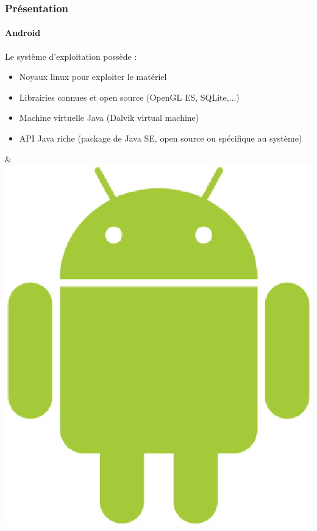 \begin{frame}
\frametitle{Présentation}
\framesubtitle{Android}

	\begin{minipage}{8cm}
		Le système d'exploitation possède : \\ 

	\begin{itemize} 
		\item Noyaux linux pour exploiter le matériel
		\item Librairies connues et open source (OpenGL ES, SQLite,...)
		\item Machine virtuelle Java (Dalvik virtual machine)
		\item API Java riche (package de Java SE, open source ou spécifique au système)
	\end{itemize}
	\end{minipage} & \includegraphics[scale=0.2]{img/android.eps} 

\end{frame}




